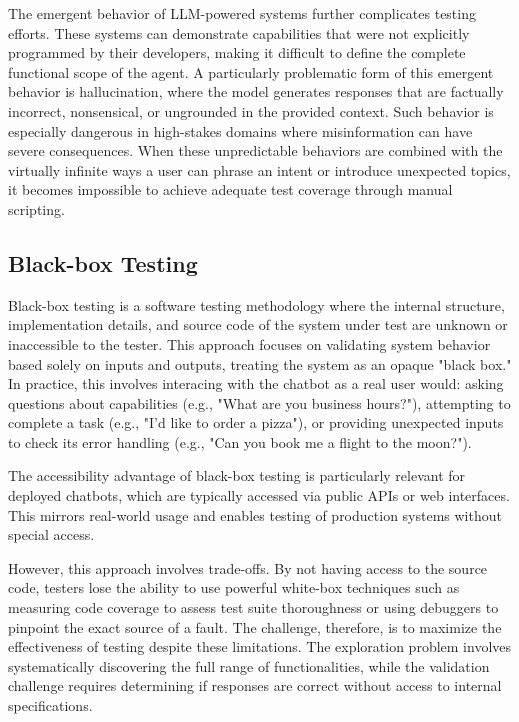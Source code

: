 The emergent behavior of \ac{LLM}-powered systems further complicates testing efforts.
These systems can demonstrate capabilities
that were not explicitly programmed by their developers,
making it difficult to define the complete functional scope of the agent.
A particularly problematic form of this emergent behavior is hallucination,
where the model generates responses that are
factually incorrect, nonsensical, or ungrounded in the provided context.
Such behavior is especially dangerous in high-stakes domains
where misinformation can have severe consequences.
When these unpredictable behaviors are combined
with the virtually infinite ways a user can
phrase an intent or introduce unexpected topics,
it becomes impossible to achieve adequate test coverage through manual scripting.

\subsection{Black-box Testing}

Black-box testing is a software testing methodology
where the internal structure, implementation details, and source code of the system under test
are unknown or inaccessible to the tester.
This approach focuses on validating system behavior based solely on inputs and outputs,
treating the system as an opaque "black box."
In practice, this involves interacing with the chatbot as a real user would:
asking questions about capabilities
(e.g., "What are you business hours?"),
attempting to complete a task
(e.g., "I'd like to order a pizza"),
or providing unexpected inputs to check its error handling
(e.g., "Can you book me a flight to the moon?").

The accessibility advantage of black-box testing
is particularly relevant for deployed chatbots,
which are typically accessed via public \acp{API} or web interfaces.
This mirrors real-world usage
and enables testing of production systems without special access.


However, this approach involves trade-offs.
By not having access to the source code,
testers lose the ability to use powerful white-box techniques
such as measuring code coverage to assess test suite thoroughness
or using debuggers to pinpoint the exact source of a fault.
The challenge, therefore, is
to maximize the effectiveness of testing
despite these limitations.
The exploration problem involves
systematically discovering the full range of functionalities,
while the validation challenge requires
determining if responses are correct
without access to internal specifications.

